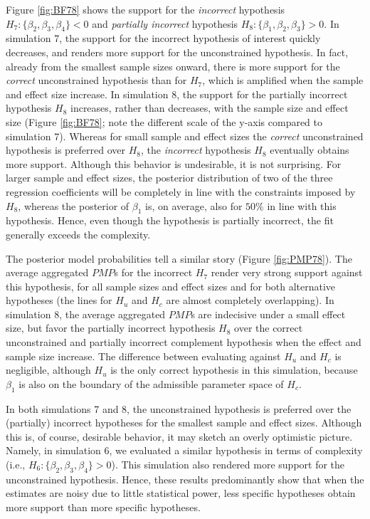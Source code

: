 \documentclass[review, 3p, authoryear]{elsarticle} %
\begin{document}
Figure \ref{fig:BF78} shows the support for the \emph{incorrect} hypothesis \(H_7: \{\beta_2, \beta_3, \beta_4\} < 0\) and \emph{partially incorrect} hypothesis \(H_8: \{\beta_1, \beta_2, \beta_3\} > 0\).
In simulation 7, the support for the incorrect hypothesis of interest quickly decreases, and renders more support for the unconstrained hypothesis.
In fact, already from the smallest sample sizes onward, there is more support for the \emph{correct} unconstrained hypothesis than for \(H_7\), which is amplified when the sample and effect size increase.
In simulation 8, the support for the partially incorrect hypothesis \(H_8\) increases, rather than decreases, with the sample size and effect size (Figure \ref{fig:BF78}; note the different scale of the y-axis compared to simulation 7).
Whereas for small sample and effect sizes the \emph{correct} unconstrained hypothesis is preferred over \(H_8\), the \emph{incorrect} hypothesis \(H_8\) eventually obtains more support.
Although this behavior is undesirable, it is not surprising.
For larger sample and effect sizes, the posterior distribution of two of the three regression coefficients will be completely in line with the constraints imposed by \(H_8\), whereas the posterior of \(\beta_1\) is, on average, also for \(50\%\) in line with this hypothesis.
Hence, even though the hypothesis is partially incorrect, the fit generally exceeds the complexity.

The posterior model probabilities tell a similar story (Figure \ref{fig:PMP78}).
The average aggregated \(PMP\)s for the incorrect \(H_7\) render very strong support against this hypothesis, for all sample sizes and effect sizes and for both alternative hypotheses (the lines for \(H_u\) and \(H_c\) are almost completely overlapping).
In simulation 8, the average aggregated \(PMP\)s are indecisive under a small effect size, but favor the partially incorrect hypothesis \(H_8\) over the correct unconstrained and partially incorrect complement hypothesis when the effect and sample size increase.
The difference between evaluating against \(H_u\) and \(H_c\) is negligible, although \(H_u\) is the only correct hypothesis in this simulation, because \(\beta_1\) is also on the boundary of the admissible parameter space of \(H_c\).

In both simulations 7 and 8, the unconstrained hypothesis is preferred over the (partially) incorrect hypotheses for the smallest sample and effect sizes.
Although this is, of course, desirable behavior, it may sketch an overly optimistic picture.
Namely, in simulation 6, we evaluated a similar hypothesis in terms of complexity (i.e., \(H_6: \{\beta_2, \beta_3, \beta_4\} > 0\)).
This simulation also rendered more support for the unconstrained hypothesis.
Hence, these results predominantly show that when the estimates are noisy due to little statistical power, less specific hypotheses obtain more support than more specific hypotheses.
\end{document}
